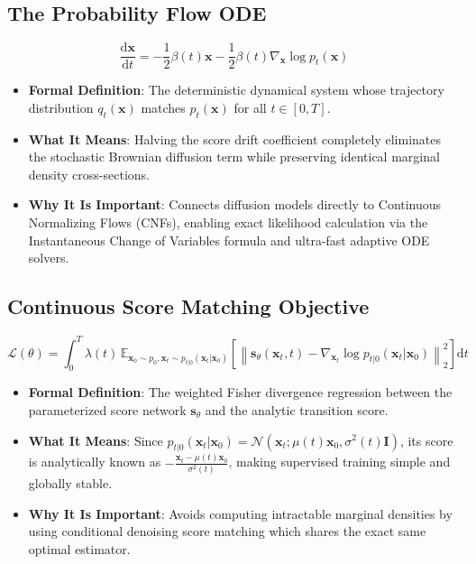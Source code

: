 \documentclass[11pt,a4paper]{article}
\theoremstyle{definition}
\begin{document}
\subsection{The Probability Flow ODE}
{\boldmath
\begin{equation}
\frac{\mathrm{d}\mathbf{x}}{\mathrm{d}t} = -\frac{1}{2}\beta(t)\mathbf{x} - \frac{1}{2}\beta(t) \nabla_\mathbf{x} \log p_t(\mathbf{x})
\end{equation}
}
\begin{itemize}
    \item \textbf{Formal Definition}: The deterministic dynamical system whose trajectory distribution $q_t(\mathbf{x})$ matches $p_t(\mathbf{x})$ for all $t \in [0, T]$.
    \item \textbf{What It Means}: Halving the score drift coefficient completely eliminates the stochastic Brownian diffusion term while preserving identical marginal density cross-sections.
    \item \textbf{Why It Is Important}: Connects diffusion models directly to Continuous Normalizing Flows (CNFs), enabling exact likelihood calculation via the Instantaneous Change of Variables formula and ultra-fast adaptive ODE solvers.
\end{itemize}

\subsection{Continuous Score Matching Objective}
{\boldmath
\begin{equation}
\mathcal{L}(\theta) = \int_0^T \lambda(t)\, \mathbb{E}_{\mathbf{x}_0 \sim p_0, \mathbf{x}_t \sim p_{t|0}(\mathbf{x}_t|\mathbf{x}_0)}\left[ \left\| \mathbf{s}_\theta(\mathbf{x}_t, t) - \nabla_{\mathbf{x}_t}\log p_{t|0}(\mathbf{x}_t|\mathbf{x}_0) \right\|_2^2 \right] \mathrm{d}t
\end{equation}
}
\begin{itemize}
    \item \textbf{Formal Definition}: The weighted Fisher divergence regression between the parameterized score network $\mathbf{s}_\theta$ and the analytic transition score.
    \item \textbf{What It Means}: Since $p_{t|0}(\mathbf{x}_t|\mathbf{x}_0) = \mathcal{N}\left(\mathbf{x}_t; \mu(t)\mathbf{x}_0, \sigma^2(t)\mathbf{I}\right)$, its score is analytically known as $-\frac{\mathbf{x}_t - \mu(t)\mathbf{x}_0}{\sigma^2(t)}$, making supervised training simple and globally stable.
    \item \textbf{Why It Is Important}: Avoids computing intractable marginal densities by using conditional denoising score matching which shares the exact same optimal estimator.
\end{itemize}
\end{document}
